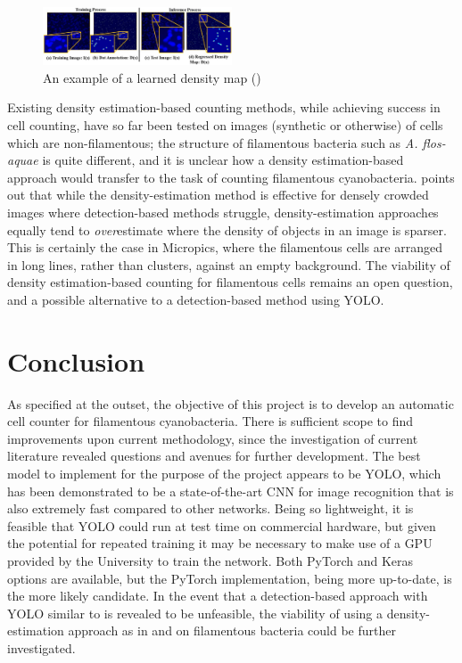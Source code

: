 \begin{figure}[h!]
	\centering
	\includegraphics[width=0.5\textwidth]{images/02Background/density.jpg}
	\caption{An example of a learned density map (\cite{xie2018microscopy})}
\end{figure}

Existing density estimation-based counting methods, while achieving success in cell counting, have so far been tested on images (synthetic or otherwise) of cells which are non-filamentous; the structure of filamentous bacteria such as \textit{A. flos-aquae} is quite different, and it is unclear how a density estimation-based approach would transfer to the task of counting filamentous cyanobacteria. \cite{Liu_2018_CVPR} points out that while the density-estimation method is effective for densely crowded images where detection-based methods struggle, density-estimation approaches equally tend to \textit{over}estimate where the density of objects in an image is sparser. This is certainly the case in Micropics, where the filamentous cells are arranged in long lines, rather than clusters, against an empty background. The viability of density estimation-based counting for filamentous cells remains an open question, and a possible alternative to a detection-based method using YOLO.

\section{Conclusion}
As specified at the outset, the objective of this project is to develop an automatic cell counter for filamentous cyanobacteria. There is sufficient scope to find improvements upon current methodology, since the investigation of current literature revealed questions and avenues for further development. The best model to implement for the purpose of the project appears to be YOLO, which has been demonstrated to be a state-of-the-art CNN for image recognition that is also extremely fast compared to other networks. Being so lightweight, it is feasible that YOLO could run at test time on commercial hardware, but given the potential for repeated training it may be necessary to make use of a GPU provided by the University to train the network. Both PyTorch and Keras options are available, but the PyTorch implementation, being more up-to-date, is the more likely candidate. In the event that a detection-based approach with YOLO similar to \cite{Identification-and-enumeration-of-cyanobacteria} is revealed to be unfeasible, the viability of using a density-estimation approach as in \cite{xie2018microscopy} and \cite{Zisserman} on filamentous bacteria could be further investigated.

